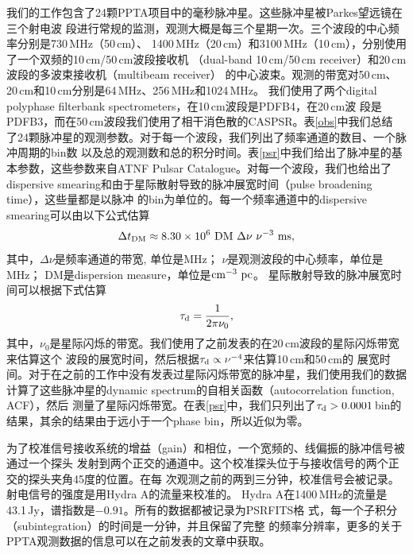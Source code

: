 我们的工作包含了24颗PPTA项目中的毫秒脉冲星。这些脉冲星被Parkes望远镜在三个射电波
段进行常规的监测，观测大概是每三个星期一次。三个波段的中心频率分别是730\,MHz（50\,cm）、
1400\,MHz（20\,cm）和3100\,MHz（10\,cm），分别使用了一个双频的10\,cm/50\,cm波段接收机
（dual-band 10\,cm/50\,cm receiver）和20\,cm波段的多波束接收机（multibeam receiver）
的中心波束。观测的带宽对50\,cm、20\,cm和10\,cm分别是64\,MHz、256\,MHz和1024\,MHz。
我们使用了两个digital polyphase filterbank spectrometers，在10\,cm波段是PDFB4，在20\,cm波
段是PDFB3，而在50\,cm波段我们使用了相干消色散的CASPSR。表\ref{obs}中我们总结
了24颗脉冲星的观测参数。对于每一个波段，我们列出了频率通道的数目、一个脉冲周期的bin数
以及总的观测数和总的积分时间。表\ref{psr}中我们给出了脉冲星的基本参数，这些参数来自ATNF Pulsar Catalogue\supercite{Manchester05}。对每一个波段，我们也给出了dispersive 
smearing和由于星际散射导致的脉冲展宽时间（pulse broadening time），这些量都是以脉冲
的bin为单位的。每一个频率通道中的dispersive smearing可以由以下公式估算
%
\begin{equation}
\Delta t_{\rm{DM}}\approx 8.30 \times 10^{6}\ \rm{DM}\ \Delta \nu\ \nu^{-3}\ \rm{ms},
\label{dm}
\end{equation}
%
其中，$\Delta \nu$是频率通道的带宽, 单位是MHz； $\nu$是观测波段的中心频率，单位是MHz； 
DM是dispersion measure，单位是$\rm{cm^{-3}\ pc}$。
%
星际散射导致的脉冲展宽时间可以根据下式估算
%
\begin{equation}
\tau_{\rm{d}} = \frac{1}{2\pi\nu_0},
\end{equation}
%
其中，$\nu_0$是星际闪烁的带宽。我们使用了之前发表的在20\,cm波段的星际闪烁带宽来估算这个
波段的展宽时间\supercite{Keith13}，然后根据$\tau_{\rm{d}}\propto\nu^{-4}$来估算10\,cm和50\,cm的
展宽时间。对于在之前的工作中没有发表过星际闪烁带宽的脉冲星，我们使用我们的数据
计算了这些脉冲星的dynamic spectrum的自相关函数（autocorrelation function, ACF），然后
测量了星际闪烁带宽\supercite{Wang05}。在表\ref{psr}中，我们只列出了$\tau_{\rm{d}}>0.0001$\,bin的结果，其余的结果由于远小于一个phase bin，所以近似为零。

为了校准信号接收系统的增益（gain）和相位，一个宽频的、线偏振的脉冲信号被通过一个探头
发射到两个正交的通道中。这个校准探头位于与接收信号的两个正交的探头夹角45度的位置。在每
次观测之前的两到三分钟，校准信号会被记录。射电信号的强度是用Hydra A的流量来校准的。
Hydra A在1400\,MHz的流量是43.1\,Jy，谱指数是$-0.91$。所有的数据都被记录为PSRFITS格
式\supercite{Hotan04}，每一个子积分（subintegration）的时间是一分钟，并且保留了完整
的频率分辨率，更多的关于PPTA观测数据的信息可以在之前发表的文章中获取\supercite{Manchester13}。

